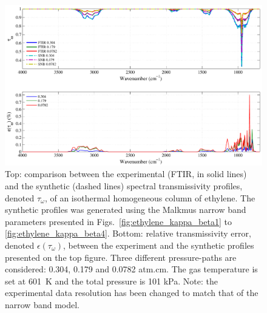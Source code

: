 \begin{figure}[p]
\includegraphics[width=\textwidth]{Figures/Comparison_Fit_Ethylene_MALKMUS_Temp601K.pdf}
\caption{Top: comparison between the experimental (FTIR, in solid lines) and the synthetic (dashed lines) spectral transmissivity profiles, denoted $\tau_{\omega}$, of an isothermal homogeneous column of ethylene. The synthetic profiles was generated using the Malkmus narrow band parameters presented in Figs.~\ref{fig:ethylene_kappa_beta1} to \ref{fig:ethylene_kappa_beta4}. Bottom: relative transmissivity error, denoted $\epsilon{(\tau_{\omega})}$, between the experiment and the synthetic profiles presented on the top figure. Three different pressure-paths are considered: 0.304, 0.179 and 0.0782 atm.cm. The gas temperature is set at 601~K and the total pressure is 101 kPa. Note: the experimental data resolution has been changed to match that of the narrow band model. \label{fig:ethylene_SNBVerify_601K}}
\end{figure}

